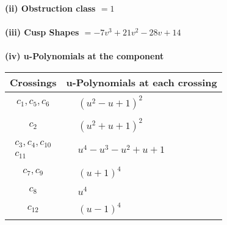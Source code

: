 \documentclass[1p]{elsarticle_modified}
\theoremstyle{definition}
\begin{document}
\flushleft \textbf{(ii) Obstruction class $= 1$}\\~\\
\flushleft \textbf{(iii) Cusp Shapes $= -7 v^3+21 v^2-28 v+14$}\\~\\
\newpage\renewcommand{\arraystretch}{1}
\flushleft \textbf{(iv) u-Polynomials at the component}\newline \\
\begin{tabular}{m{50pt}|m{274pt}}
Crossings & \hspace{64pt}u-Polynomials at each crossing \\
\hline $$\begin{aligned}c_{1},c_{5},c_{6}\end{aligned}$$&$\begin{aligned}
&(u^2- u+1)^2
\end{aligned}$\\
\hline $$\begin{aligned}c_{2}\end{aligned}$$&$\begin{aligned}
&(u^2+u+1)^2
\end{aligned}$\\
\hline $$\begin{aligned}c_{3},c_{4},c_{10}\\c_{11}\end{aligned}$$&$\begin{aligned}
&u^4- u^3- u^2+u+1
\end{aligned}$\\
\hline $$\begin{aligned}c_{7},c_{9}\end{aligned}$$&$\begin{aligned}
&(u+1)^4
\end{aligned}$\\
\hline $$\begin{aligned}c_{8}\end{aligned}$$&$\begin{aligned}
&u^4
\end{aligned}$\\
\hline $$\begin{aligned}c_{12}\end{aligned}$$&$\begin{aligned}
&(u-1)^4
\end{aligned}$\\
\hline
\end{tabular}\\~\\
\end{document}
